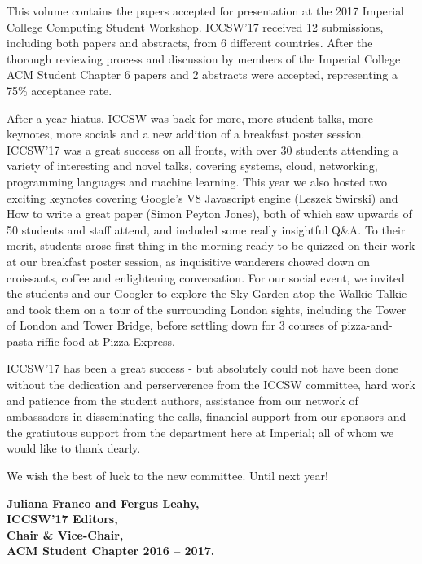 \documentclass[a4paper,UKenglish]{oasicsmaster-v2016}
\begin{document}
This volume contains the papers accepted for presentation at the 2017 Imperial College Computing Student Workshop. ICCSW’17 received 12 submissions, including both papers and abstracts, from 6 different countries. After the thorough reviewing process and discussion by members of the Imperial College ACM Student Chapter 6 papers and 2 abstracts were accepted, representing a 75\% acceptance rate.


After a year hiatus, ICCSW was back for more, more student talks, more keynotes, more socials and a new addition of a breakfast poster session. ICCSW'17 was a great success on all fronts, with over 30 students attending a variety of interesting and novel talks, covering systems, cloud, networking, programming languages and machine learning. This year we also hosted two exciting keynotes covering Google’s V8 Javascript engine (Leszek Swirski) and How to write a great paper (Simon Peyton Jones), both of which saw upwards of 50 students and staff attend, and included some really insightful Q\&A. To their merit, students arose first thing in the morning ready to be quizzed on their work at our breakfast poster session, as inquisitive wanderers chowed down on croissants, coffee and enlightening conversation. For our social event, we invited the students and our Googler to explore the Sky Garden atop the Walkie-Talkie and took them on a tour of the surrounding London sights, including the Tower of London and Tower Bridge, before settling down for 3 courses of pizza-and-pasta-riffic food at Pizza Express.



ICCSW'17 has been a great success - but absolutely could not have been done without the dedication and perserverence from the ICCSW committee, hard work and patience from the student authors, assistance from our network of ambassadors in disseminating the calls, financial support from our sponsors and the gratiutous support from the department here at Imperial; all of whom we would like to thank dearly. 

We wish the best of luck to the new committee. Until next year!
\vspace{5ex}

\noindent \textbf{Juliana Franco and Fergus Leahy, \\
ICCSW'17 Editors, \\
Chair \& Vice-Chair,\\
ACM Student Chapter 2016 -- 2017.}
\vfill

\newpage
\end{document}

